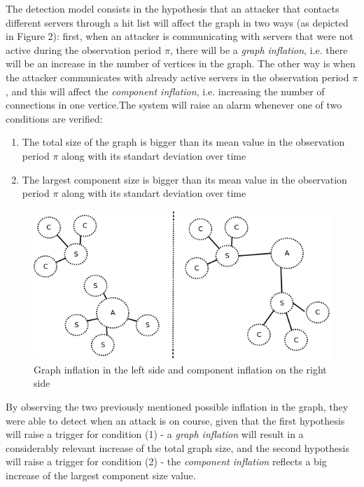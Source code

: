 \documentclass[runningheads,a4paper]{llncs}
\begin{document}
The detection model consists in the hypothesis that an attacker that contacts different servers through a hit list will affect the graph in two ways (as depicted in Figure 2): first, when an attacker is communicating with servers that were not active during the observation period $\pi$, there will be a \textit{graph inflation}, i.e. there will be an increase in the number of vertices in the graph. The other way is when the attacker communicates with already active servers in the observation period $\pi$, and this will affect the \textit{component inflation}, i.e. increasing the number of connections in one vertice.The system will raise an alarm whenever one of two conditions are verified:
\begin{enumerate}
\item The total size of the graph is bigger than its mean value in the observation period $\pi$ along with its standart deviation over time
\item The largest component size is bigger than its mean value in the observation period $\pi$ along with its standart deviation over time
\end{enumerate}

\begin{figure}[htp]
\centering
\includegraphics[scale=0.3]{g_inflations.png}
\caption{Graph inflation in the left side and component inflation on the right side}
\label{2}
\end{figure}

By observing the two previously mentioned possible inflation in the graph, they were able to detect when an attack is on course, given that the first hypothesis will raise a trigger for condition (1) - a \textit{graph inflation} will result in a considerably relevant increase of the total graph size, and the second hypothesis will raise a trigger for condition (2) - the \textit{component inflation} reflects a big increase of the largest component size value.
\end{document}
